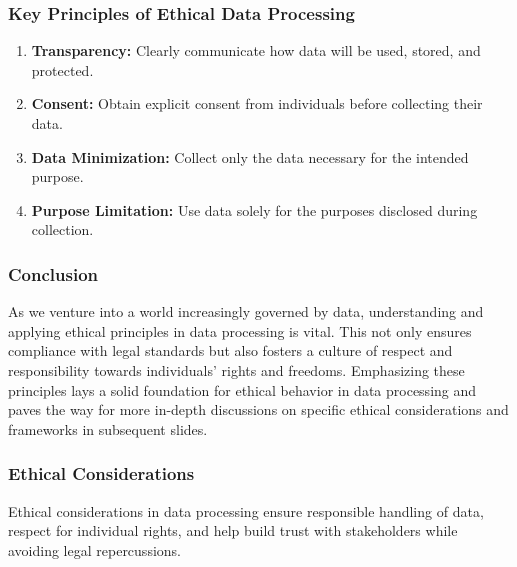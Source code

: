 \documentclass[aspectratio=169]{beamer}
\begin{document}
\begin{frame}[fragile]
    \frametitle{Key Principles of Ethical Data Processing}
    \begin{enumerate}
        \item \textbf{Transparency:} Clearly communicate how data will be used, stored, and protected.
        
        \item \textbf{Consent:} Obtain explicit consent from individuals before collecting their data.
        
        \item \textbf{Data Minimization:} Collect only the data necessary for the intended purpose.
        
        \item \textbf{Purpose Limitation:} Use data solely for the purposes disclosed during collection.
    \end{enumerate}
\end{frame}

\begin{frame}[fragile]
    \frametitle{Conclusion}
    As we venture into a world increasingly governed by data, understanding and applying ethical principles in data processing is vital. This not only ensures compliance with legal standards but also fosters a culture of respect and responsibility towards individuals’ rights and freedoms. Emphasizing these principles lays a solid foundation for ethical behavior in data processing and paves the way for more in-depth discussions on specific ethical considerations and frameworks in subsequent slides.
\end{frame}

\begin{frame}[fragile]
    \frametitle{Ethical Considerations}
    Ethical considerations in data processing ensure responsible handling of data, respect for individual rights, and help build trust with stakeholders while avoiding legal repercussions.
\end{frame}
\end{document}
